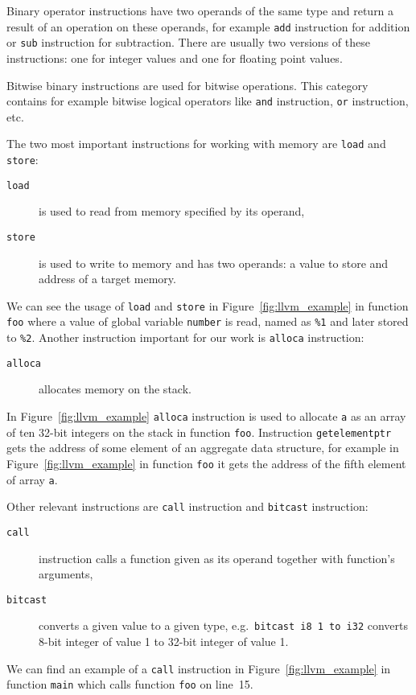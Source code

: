 Binary operator instructions have two operands of the same type and return a
result of an operation on these operands, for example \texttt{add} instruction
for addition or \texttt{sub} instruction for subtraction. There are usually two
versions of these instructions: one for integer values and one for floating
point values.

Bitwise binary instructions are used for bitwise operations. This category
contains for example bitwise logical operators like \texttt{and} instruction,
\texttt{or} instruction, etc.

The two most important instructions for working with memory are \texttt{load}
and \texttt{store}:
\begin{description}
\item[\texttt{load}] is used to read from memory specified by its operand,
\item[\texttt{store}] is used to write to memory and has two operands: a value
to store and address of a target memory.
\end{description}
We can see the usage of \texttt{load} and \texttt{store} in
Figure~\ref{fig:llvm_example} in function \texttt{foo} where a value of global
variable \texttt{number} is read, named as \texttt{\%1} and later stored to
\texttt{\%2}. Another instruction important for our work is \texttt{alloca}
instruction:
\begin{description}
\item[\texttt{alloca}] allocates memory on the stack.
\end{description}
In Figure~\ref{fig:llvm_example} \texttt{alloca} instruction is used to
allocate \texttt{a} as an array of ten 32-bit integers on the stack in function
\texttt{foo}. Instruction \texttt{getelementptr} gets the address of some
element of an aggregate data structure, for example in
Figure~\ref{fig:llvm_example} in function \texttt{foo} it gets the address of
the fifth element of array \texttt{a}.

Other relevant instructions are \texttt{call} instruction and \texttt{bitcast}
instruction:
\begin{description}
\item[\texttt{call}] instruction calls a function given as its
operand together with function's arguments,
\item[\texttt{bitcast}] converts a given value to a given type, e.g.~\texttt{bitcast i8 1 to
i32} converts 8-bit integer of value 1 to 32-bit integer of value 1.
\end{description}
 We can find an example of a \texttt{call} instruction in
 Figure~\ref{fig:llvm_example} in function \texttt{main} which calls function
 \texttt{foo} on line~15.
